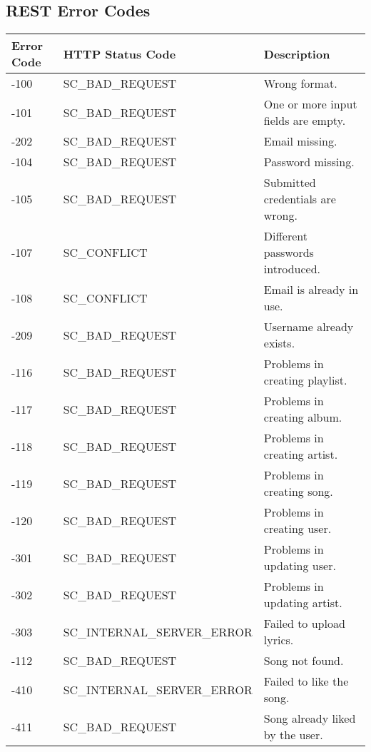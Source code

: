 \subsection{REST Error Codes}


\begin{longtable}{|p{}|p{} |p{}|} 
\hline
\textbf{Error Code} & \textbf{HTTP Status Code} & \textbf{Description} \\\hline

        -100 & SC\_BAD\_REQUEST & Wrong format. \\\hline
        -101 & SC\_BAD\_REQUEST & One or more input fields are empty. \\\hline
        -202 & SC\_BAD\_REQUEST & Email missing. \\\hline
        -104 & SC\_BAD\_REQUEST  & Password missing. \\\hline
        -105 & SC\_BAD\_REQUEST & Submitted credentials are wrong. \\\hline
        -107 & SC\_CONFLICT & Different passwords introduced. \\\hline
        -108 & SC\_CONFLICT & Email is already in use. \\\hline
        -209 &  SC\_BAD\_REQUEST & Username already exists. \\\hline
        -116 &  SC\_BAD\_REQUEST & Problems in creating playlist. \\\hline
        -117 & SC\_BAD\_REQUEST & Problems in creating album. \\\hline
        -118 & SC\_BAD\_REQUEST & Problems in creating artist. \\\hline
        -119 & SC\_BAD\_REQUEST & Problems in creating song. \\\hline
        -120 & SC\_BAD\_REQUEST & Problems in creating user. \\\hline
        -301 & SC\_BAD\_REQUEST & Problems in updating user. \\\hline
        -302 & SC\_BAD\_REQUEST & Problems in updating artist. \\\hline
        -303 & SC\_INTERNAL\_SERVER\_ERROR & Failed to upload lyrics. \\\hline
        -112 & SC\_BAD\_REQUEST & Song not found. \\\hline
        -410 & SC\_INTERNAL\_SERVER\_ERROR & Failed to like the song. \\\hline
        -411 & SC\_BAD\_REQUEST & Song already liked by the user. \\\hline

\end{longtable}
